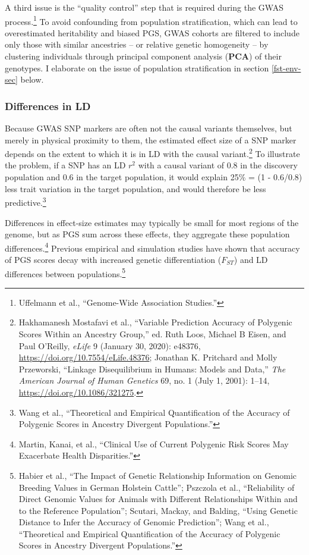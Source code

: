 \documentclass[
]{book}
\begin{document}
A third issue is the ``quality control'' step that is required during the GWAS process.\footnote{Uffelmann et al., {``Genome-Wide Association Studies.''}} To avoid confounding from population stratification, which can lead to overestimated heritability and biased PGS, GWAS cohorts are filtered to include only those with similar ancestries -- or relative genetic homogeneity -- by clustering individuals through principal component analysis (\textbf{PCA}) of their genotypes. I elaborate on the issue of population stratification in section \ref{fst-env-sec} below.

\hypertarget{differences-in-ld}{%
\subsubsection{Differences in LD}\label{differences-in-ld}}

Because GWAS SNP markers are often not the causal variants themselves, but merely in physical proximity to them, the estimated effect size of a SNP marker depends on the extent to which it is in LD with the causal variant.\footnote{Hakhamanesh Mostafavi et al., {``Variable Prediction Accuracy of Polygenic Scores Within an Ancestry Group,''} ed. Ruth Loos, Michael B Eisen, and Paul O'Reilly, \emph{eLife} 9 (January 30, 2020): e48376, \url{https://doi.org/10.7554/eLife.48376}; Jonathan K. Pritchard and Molly Przeworski, {``Linkage {Disequilibrium} in {Humans}: {Models} and {Data},''} \emph{The American Journal of Human Genetics} 69, no. 1 (July 1, 2001): 1--14, \url{https://doi.org/10.1086/321275}.} To illustrate the problem, if a SNP has an LD \(r^2\) with a causal variant of 0.8 in the discovery population and 0.6 in the target population, it would explain 25\% = (1 - 0.6/0.8) less trait variation in the target population, and would therefore be less predictive.\footnote{Wang et al., {``Theoretical and Empirical Quantification of the Accuracy of Polygenic Scores in Ancestry Divergent Populations.''}}

Differences in effect-size estimates may typically be small for most regions of the genome, but as PGS sum across these effects, they aggregate these population differences.\footnote{Martin, Kanai, et al., {``Clinical Use of Current Polygenic Risk Scores May Exacerbate Health Disparities.''}} Previous empirical and simulation studies have shown that accuracy of PGS scores decay with increased genetic differentiation (\(F_{ST}\)) and LD differences between populations.\footnote{Habier et al., {``The Impact of Genetic Relationship Information on Genomic Breeding Values in {German Holstein} Cattle''}; Pszczola et al., {``Reliability of Direct Genomic Values for Animals with Different Relationships Within and to the Reference Population''}; Scutari, Mackay, and Balding, {``Using {Genetic Distance} to {Infer} the {Accuracy} of {Genomic Prediction}''}; Wang et al., {``Theoretical and Empirical Quantification of the Accuracy of Polygenic Scores in Ancestry Divergent Populations.''}}
\end{document}
